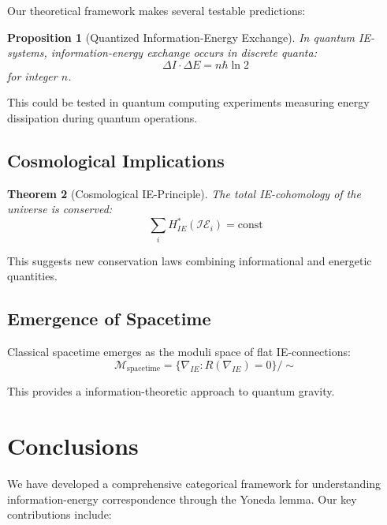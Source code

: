 \documentclass[12pt]{article}
\newtheorem{theorem}{Theorem}[section]
\newtheorem{proposition}[theorem]{Proposition}
\begin{document}
Our theoretical framework makes several testable predictions:

\begin{proposition}[Quantized Information-Energy Exchange]
In quantum IE-systems, information-energy exchange occurs in discrete quanta:
\[\Delta I \cdot \Delta E = n \hbar \ln 2\]
for integer $n$.
\end{proposition}

This could be tested in quantum computing experiments measuring energy dissipation during quantum operations.

\subsection{Cosmological Implications}

\begin{theorem}[Cosmological IE-Principle]
The total IE-cohomology of the universe is conserved:
\[\sum_i H^*_{IE}(\mathcal{IE}_i) = \text{const}\]
\end{theorem}

This suggests new conservation laws combining informational and energetic quantities.

\subsection{Emergence of Spacetime}

\begin{conjecture}
Classical spacetime emerges as the moduli space of flat IE-connections:
\[\mathcal{M}_{\text{spacetime}} = \{\nabla_{IE} : R(\nabla_{IE}) = 0\}/\sim\]
\end{conjecture}

This provides a information-theoretic approach to quantum gravity.

\section{Conclusions}

We have developed a comprehensive categorical framework for understanding information-energy correspondence through the Yoneda lemma. Our key contributions include:
\end{document}
